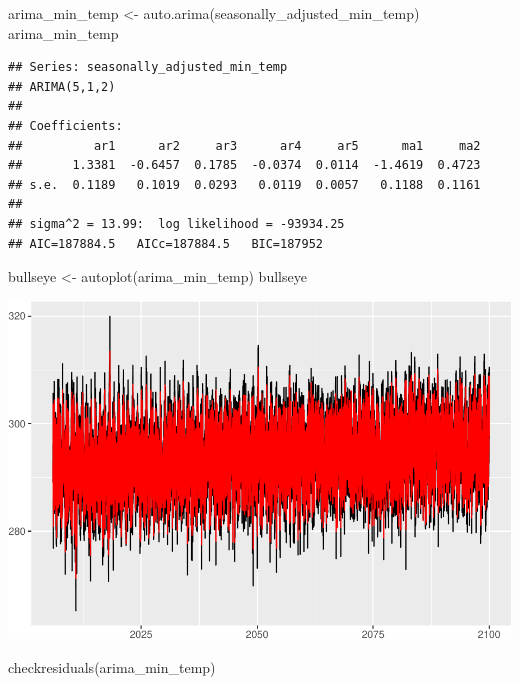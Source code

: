 \documentclass[
  paper=a4,
  ,captions=tableheading
]{scrartcl}
\newenvironment{Shaded}{\begin{snugshade}}{\end{snugshade}}
\newcommand{\FunctionTok}[1]{\textcolor[rgb]{0.00,0.00,0.00}{#1}}
\newcommand{\NormalTok}[1]{#1}
\newcommand{\OtherTok}[1]{\textcolor[rgb]{0.56,0.35,0.01}{#1}}
\begin{document}
\begin{Shaded}
\begin{Highlighting}[]
\NormalTok{arima\_min\_temp }\OtherTok{\textless{}{-}} \FunctionTok{auto.arima}\NormalTok{(seasonally\_adjusted\_min\_temp)}
\NormalTok{arima\_min\_temp}
\end{Highlighting}
\end{Shaded}

\begin{verbatim}
## Series: seasonally_adjusted_min_temp 
## ARIMA(5,1,2) 
## 
## Coefficients:
##          ar1      ar2     ar3      ar4     ar5      ma1     ma2
##       1.3381  -0.6457  0.1785  -0.0374  0.0114  -1.4619  0.4723
## s.e.  0.1189   0.1019  0.0293   0.0119  0.0057   0.1188  0.1161
## 
## sigma^2 = 13.99:  log likelihood = -93934.25
## AIC=187884.5   AICc=187884.5   BIC=187952
\end{verbatim}

\begin{Shaded}
\begin{Highlighting}[]
\NormalTok{bullseye }\OtherTok{\textless{}{-}} \FunctionTok{autoplot}\NormalTok{(arima\_min\_temp) }
\NormalTok{bullseye}
\end{Highlighting}
\end{Shaded}

\includegraphics{Haskell_files/figure-latex/unnamed-chunk-60-1.pdf}

\begin{Shaded}
\begin{Highlighting}[]
\FunctionTok{checkresiduals}\NormalTok{(arima\_min\_temp)}
\end{Highlighting}
\end{Shaded}
\end{document}

